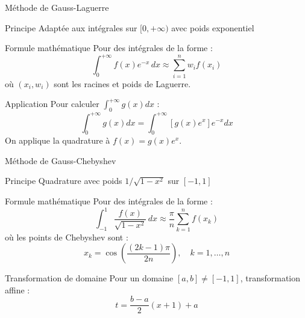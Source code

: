 \documentclass[aspectratio=169,11pt]{beamer}
\begin{document}
\begin{frame}{Méthode de Gauss-Laguerre}
\vspace{-0.2cm}
\begin{block}{Principe}
\small Adaptée aux intégrales sur $[0, +\infty)$ avec poids exponentiel
\end{block}

\vspace{-0.15cm}
\begin{block}{Formule mathématique}
\small
Pour des intégrales de la forme :
\begin{equation}
\int_0^{+\infty} f(x) e^{-x} \, dx \approx \sum_{i=1}^n w_i f(x_i)
\end{equation}
où $(x_i, w_i)$ sont les racines et poids de Laguerre.
\end{block}

\vspace{-0.15cm}
\begin{block}{Application}
\small
Pour calculer $\int_0^{+\infty} g(x) dx$ :
\begin{equation}
\int_0^{+\infty} g(x) dx = \int_0^{+\infty} [g(x) e^x] e^{-x} dx
\end{equation}
On applique la quadrature à $f(x) = g(x) e^x$.
\end{block}
\end{frame}

\begin{frame}{Méthode de Gauss-Chebyshev}
\vspace{-0.2cm}
\begin{block}{Principe}
\small Quadrature avec poids $1/\sqrt{1-x^2}$ sur $[-1,1]$
\end{block}

\vspace{-0.15cm}
\begin{block}{Formule mathématique}
\small
Pour des intégrales de la forme :
\begin{equation}
\int_{-1}^{1} \frac{f(x)}{\sqrt{1-x^2}} \, dx \approx \frac{\pi}{n} \sum_{k=1}^n f(x_k)
\end{equation}
où les points de Chebyshev sont :
\begin{equation}
x_k = \cos\left(\frac{(2k-1)\pi}{2n}\right), \quad k=1,\ldots,n
\end{equation}
\end{block}

\vspace{-0.15cm}
\begin{block}{Transformation de domaine}
\small
Pour un domaine $[a,b] \neq [-1,1]$, transformation affine :
\begin{equation}
t = \frac{b-a}{2}(x+1) + a
\end{equation}
\end{block}
\end{frame}
\end{document}
